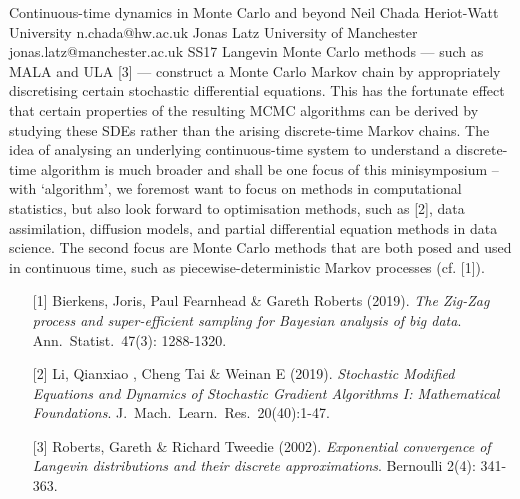 \documentclass[12pt,a4paper,figuresright]{book}
\begin{document}



\clearpage
\begin{session}
 {Continuous-time dynamics in Monte Carlo and beyond}%
 {Neil Chada}%
 {Heriot-Watt University}%
 {n.chada@hw.ac.uk}%
 {Jonas Latz}%
 {University of Manchester } %
 {jonas.latz@manchester.ac.uk }%
 {SS17}
 {}
 Langevin Monte Carlo methods — such as MALA and ULA [3] — construct a Monte Carlo Markov chain by appropriately discretising certain stochastic differential equations.
 This has the fortunate effect that certain properties of the resulting MCMC algorithms can be derived by studying these SDEs rather than the arising discrete-time Markov chains.
 The idea of analysing an underlying continuous-time system to understand a discrete-time algorithm is much broader and shall be one focus of this minisymposium – with `algorithm’,
 we foremost want to focus on methods in computational statistics, but also look forward to optimisation methods, such as [2], data assimilation, diffusion models, and partial differential equation
 methods in data science. The second focus are Monte Carlo methods that are both posed and used in continuous time, such as piecewise-deterministic Markov processes (cf. [1]).
 \medskip

 \begin{enumerate}
 \item[{[1]}] Bierkens, Joris, Paul Fearnhead \& Gareth Roberts (2019). {\it The Zig-Zag process and super-efficient sampling for Bayesian analysis of big data}. Ann.\ Statist.\ 47(3): 1288-1320.
 \item[{[2]}] Li, Qianxiao , Cheng Tai \& Weinan E (2019). {\it Stochastic Modified Equations and Dynamics of Stochastic Gradient Algorithms I: Mathematical Foundations}. J.\ Mach.\ Learn.\ Res.\ 20(40):1-47.
 \item[{[3]}] Roberts, Gareth \& Richard Tweedie (2002). {\it Exponential convergence of Langevin distributions and their discrete approximations}. Bernoulli 2(4): 341-363.
 \end{enumerate}
\end{session}
\end{document}
